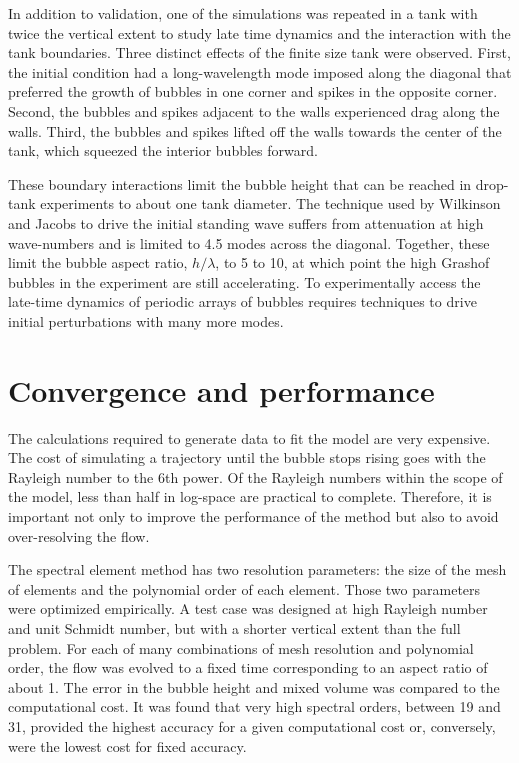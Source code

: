 In addition to validation, one of the simulations was repeated in a tank with twice the vertical extent to study late time dynamics and the interaction with the tank boundaries.
Three distinct effects of the finite size tank were observed.
First, the initial condition had a long-wavelength mode imposed along the diagonal that preferred the growth of bubbles in one corner and spikes in the opposite corner.
Second, the bubbles and spikes adjacent to the walls experienced drag along the walls.
Third, the bubbles and spikes lifted off the walls towards the center of the tank, which squeezed the interior bubbles forward.

These boundary interactions limit the bubble height that can be reached in drop-tank experiments to about one tank diameter.
The technique used by Wilkinson and Jacobs to drive the initial standing wave suffers from attenuation at high wave-numbers and is limited to 4.5 modes across the diagonal.
Together, these limit the bubble aspect ratio, $h/\lambda$, to 5 to 10, at which point the high Grashof bubbles in the experiment are still accelerating.
To experimentally access the late-time dynamics of periodic arrays of bubbles requires techniques to drive initial perturbations with many more modes.

\section{Convergence and performance}

The calculations required to generate data to fit the model are very expensive.
The cost of simulating a trajectory until the bubble stops rising goes with the Rayleigh number to the 6th power.
Of the Rayleigh numbers within the scope of the model, less than half in log-space are practical to complete.
Therefore, it is important not only to improve the performance of the method but also to avoid over-resolving the flow.

The spectral element method has two resolution parameters: the size of the mesh of elements and the polynomial order of each element.
Those two parameters were optimized empirically.
A test case was designed at high Rayleigh number and unit Schmidt number, but with a shorter vertical extent than the full problem.
For each of many combinations of mesh resolution and polynomial order, the flow was evolved to a fixed time corresponding to an aspect ratio of  about 1.
The error in the bubble height and mixed volume was compared to the computational cost.
It was found that very high spectral orders, between 19 and 31, provided the highest accuracy for a given computational cost or, conversely, were the lowest cost for fixed accuracy.

